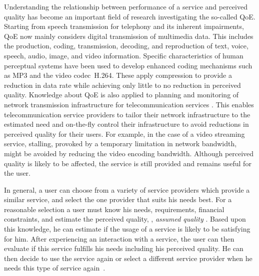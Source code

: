 Understanding the relationship between performance of a service and perceived quality has become an important field of research investigating the so-called \ac{QoE}.
Starting from speech transmission for telephony \citep[][]{ieee_audio_and_electroacoustics_group_ieee_1969} and its inherent impairments, \ac{QoE} now mainly considers digital transmission of multimedia data. %
This includes the production, coding, transmission, decoding, and reproduction of text, voice, speech, audio, image, and video information.
Specific characteristics of human perceptual systems have been used to develop enhanced coding mechanisms such as \ac{MP3} and the video codec~H.264.
These apply compression to provide a reduction in data rate while achieving only little to no reduction in perceived quality.
Knowledge about \ac{QoE} is also applied to planning and monitoring of network transmission infrastructure for telecommunication services \citep[][]{schatz_qoe-based_2014}.
This enables telecommunication service providers to tailor their network infrastructure to the estimated need and on-the-fly control their infrastructure to avoid reductions in perceived quality for their users.
For example, in the case of a video streaming service, stalling, provoked by a temporary limitation in network bandwidth, might be avoided by reducing the video encoding bandwidth.
Although perceived quality is likely to be affected, the service is still provided and remains useful for the user.

In general, a user can choose from a variety of service providers which provide a similar service, and select the one provider that suits his needs best.
For a reasonable selection a user must know his needs, requirements, financial constraints, and estimate the perceived quality, \ie, \emph{assumed quality} \citep[][p.\,13]{raake_quality_2014}.
Based upon this knowledge, he can estimate if the usage of a service is likely to be satisfying for him.
After experiencing an interaction with a service, the user can then evaluate if this service fulfills his needs including his perceived quality.
He can then decide to use the service again or select a different service provider when he needs this type of service again~\citep[][]{geerts_linking_2010}.

